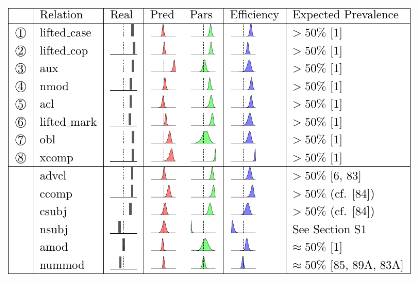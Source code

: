 \documentclass[10pt,twoside,lineno]{article}
\begin{document}
\begin{table} %
	\begin{center}	
\includegraphics[width=0.8\textwidth]{si-table-perrel-1a-1.png}
\end{center}
\caption{Predictions on UD relations with predictions from the typological literature.
The first section contains the eight correlations discussed in the main paper (See Section~\ref{sec:correlations}); the second section provides other relations for which predictions are available.
The `Real' column provides the prevalence among the 51 languages in the Universal Dependencies data.
We provide posterior prevalences for grammars optimized for Efficiency, and for grammars optimized for Pars(eability) and Pred(ictability) alone, obtained from the Bayesian mixed-effects analysis controlling for languages and language families (as in Table 2 of the main paper).
In the last column, we indicate what prevalence is expected according to the typological literature. 
}
\label{tab:all-predictions-1}
\end{table}
\end{document}
